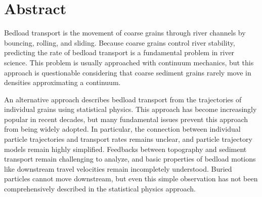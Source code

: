 
\chapter{Abstract}

Bedload transport is the movement of coarse grains through river channels by bouncing, rolling, and sliding.
Because coarse grains control river stability, predicting the rate of bedload transport is a fundamental problem in river science.
This problem is usually approached with continuum mechanics, but this approach is questionable considering that coarse sediment grains rarely move in densities approximating a continuum.

An alternative approach describes bedload transport from the trajectories of individual grains using statistical physics.
This approach has become increasingly popular in recent decades, but many fundamental issues prevent this approach from being widely adopted.
In particular, the connection between individual particle trajectories and transport rates remains unclear, and particle trajectory models remain highly simplified.
Feedbacks between topography and sediment transport remain challenging to analyze, and basic properties of bedload motions like downstream travel velocities remain incompletely understood.
Buried particles cannot \DIFaddbegin {}\DIFaddend move downstream, but even this simple observation has not been comprehensively described in the statistical physics approach.

